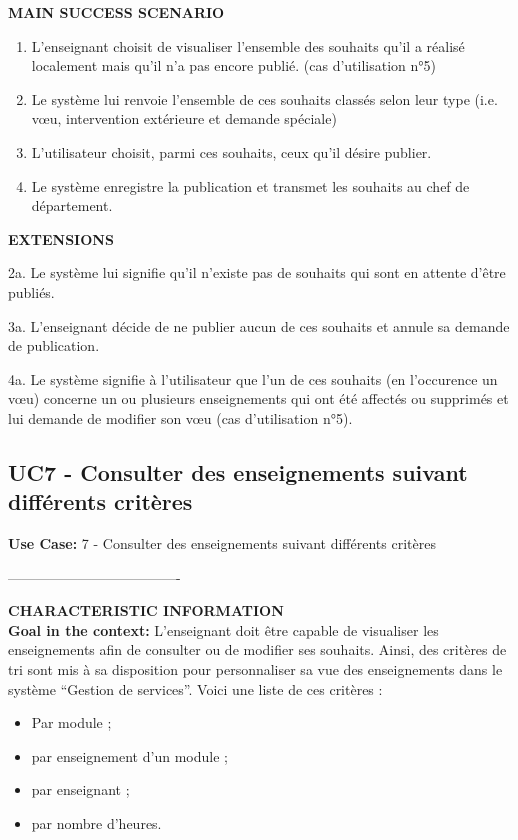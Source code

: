  \noindent\textbf{MAIN SUCCESS SCENARIO}
 \begin{enumerate}
 \item L'enseignant choisit de visualiser l'ensemble des souhaits qu'il a réalisé localement mais qu'il n'a pas encore publié. (cas d'utilisation n°5)
 \item Le système lui renvoie l'ensemble de ces souhaits classés selon leur type (i.e. v\oe u, intervention extérieure et demande spéciale)
 \item L'utilisateur choisit, parmi ces souhaits, ceux qu'il désire publier.
 \item Le système enregistre la publication et transmet les souhaits au chef de département.\\
 \end{enumerate}

 \noindent\textbf{EXTENSIONS}
 \begin{list}{}{}
 \item 2a. Le système lui signifie qu'il n'existe pas de souhaits qui sont en attente d'être publiés.
 \item 3a. L'enseignant décide de ne publier aucun de ces souhaits et annule sa demande de publication.
 \item 4a. Le système signifie à l'utilisateur que l'un de ces souhaits (en l'occurence un v\oe u) concerne un ou plusieurs enseignements qui ont été affectés ou supprimés et lui demande de modifier son v\oe u (cas d'utilisation n°5).\\
 \end{list}


 \subsection{UC7 - Consulter des enseignements suivant différents critères}

 \noindent\textbf{Use Case:} 7 - Consulter des enseignements suivant différents critères

 \noindent\--------------------------------------

 \noindent\textbf{CHARACTERISTIC INFORMATION}\\

 \noindent \textbf{Goal in the context:}
 L'enseignant doit être capable de visualiser les enseignements afin de consulter ou de modifier ses souhaits.
 Ainsi, des critères de tri sont mis à sa disposition pour personnaliser sa vue des enseignements dans le système ``Gestion de services''.
 Voici une liste de ces critères :
 \begin{itemize}
 \item Par module ;
 \item par enseignement d'un module ;
 \item par enseignant ;
 \item par nombre d'heures.
 \end{itemize}

